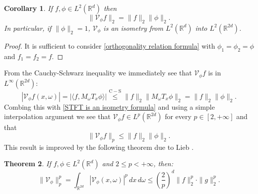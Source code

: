 \documentclass[corpo=11pt, stile=classica, tipotesi=custom,
greek, evenboxes, english]{toptesi} %
\numberwithin{equation}{chapter}
\newtheorem{teo}{Theorem}[chapter] %
\newtheorem{cor}[teo]{Corollary}
\theoremstyle{definition}
\theoremstyle{remark}
\newcommand{\R}{\mathbb{R}} %
\newcommand{\V}{\mathcal{V}} %
\begin{document}
\begin{cor}
	If $f, \phi \in L^2(\R^d)$ then
	\begin{equation}\label{STFT is an isometry formula}
		\| \V_{\phi} f\|_2 = \| f \|_2 \| \phi \|_2.
	\end{equation} 
	In particular, if $\| \phi \|_2 = 1$, $\V_{\phi}$ is an isometry from $L^2(\R^d)$ into $L^2(\R^{2d})$.
\end{cor}
\begin{proof}
	It is sufficient to consider \eqref{orthogonality relation formula} with $\phi_1 = \phi_2 = \phi$ and $f_1 = f_2 = f$.
\end{proof}
From the Cauchy-Schwarz inequality we immediately see that $\V_{\phi} f$ is in $L^{\infty}(\R^{2d})$:
\begin{equation}\label{STFT is bounded}
	|\V_{\phi} f(x,\omega)| = |\langle f, M_{\omega} T_x \phi\rangle| \overset{\mathrm{C-S}}{\leq} \|f\|_2 \|M_{\omega}T_x \phi\|_2 = \|f\|_2 \|\phi\|_2.
\end{equation}
Combing this with \eqref{STFT is an isometry formula} and using a simple interpolation argument we see that $\V_{\phi}f \in L^p(\R^{2d})$ for every $p \in [2,+\infty]$ and that 
\begin{equation}\label{STFT is in L^p for p>=2}
	\|\V_{\phi}f\|_p \leq \|f\|_2 \|\phi\|_2.
\end{equation}
This result is improved by the following theorem due to Lieb \cite{lieb_integral}.
\begin{teo}\label{Lieb's inequality}
	If $f,\phi \in L^2(\R^d)$ and $2 \leq p < +\infty$, then:
	\begin{equation}\label{Lieb's inequality formula}
		\| \V_{\phi} \|_p^p = \int_{\R^{2d}} |\V_{\phi}(x,\omega)|^p \,dx\,d\omega \leq \left(\dfrac{2}{p}\right)^d \|f\|_2^p \cdot \|g\|_2^p.
	\end{equation}
\end{teo}
\end{document}
